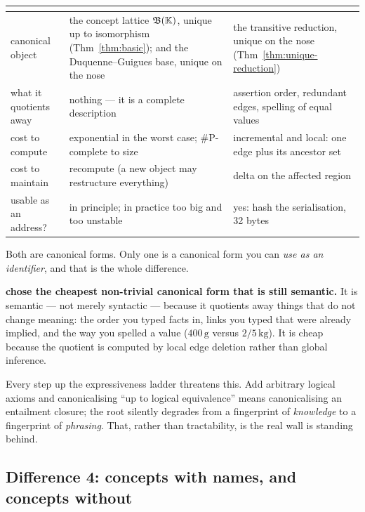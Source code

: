 \begin{center}\small
\begin{tabularx}{\textwidth}{@{}p{3.3cm} X X@{}}
\toprule
& \textbf{\fca{}} & \textbf{\odag{}}\\
\midrule
canonical object & the concept lattice $\mathfrak{B}(\mathbb{K})$, unique up to isomorphism
  (Thm~\ref{thm:basic}); and the Duquenne--Guigues base, unique on the nose
  \citep{guigues1986}
  & the transitive reduction, unique on the nose
  (Thm~\ref{thm:unique-reduction})\\
what it quotients away & nothing --- it is a complete description
  & assertion order, redundant edges, spelling of equal values\\
cost to compute & exponential in the worst case; $\#\mathrm{P}$-complete to
  size \citep{kuznetsov2001}
  & incremental and local: one edge plus its ancestor set\\
cost to maintain & recompute (a new object may restructure everything)
  & delta on the affected region\\
usable as an address? & in principle; in practice too big and too unstable
  & yes: hash the serialisation, 32 bytes\\
\bottomrule
\end{tabularx}
\end{center}

Both are canonical forms. Only one is a canonical form you can \emph{use as an
identifier}, and that is the whole difference.

\begin{keyidea}
\textbf{\odag{} chose the cheapest non-trivial canonical form that is still
semantic.} It is semantic --- not merely syntactic --- because it quotients
away things that do not change meaning: the order you typed facts in, links
you typed that were already implied, and the way you spelled a value
($400\,\mathrm{g}$ versus $2/5\,\mathrm{kg}$). It is cheap because the
quotient is computed by local edge deletion rather than global inference.

Every step up the expressiveness ladder threatens this. Add arbitrary logical
axioms and canonicalising ``up to logical equivalence'' means canonicalising
an entailment closure; the root silently degrades from a fingerprint of
\emph{knowledge} to a fingerprint of \emph{phrasing}. That, rather than
tractability, is the real wall \odag{} is standing behind.
\end{keyidea}

\subsection{Difference 4: concepts with names, and concepts without}
\label{sec:identity}

